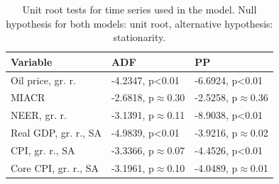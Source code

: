 \documentclass[12pt, a4paper]{extarticle}
\begin{document}
\begin{table}[h!]
	\centering
		\begin{tabular}{@{}lll@{}}
			 \toprule
			Variable & ADF & PP \\
			\midrule
			Oil price, gr. r.     & {-4.2347, p\textless{}0.01} &{-6.6924, p\textless{}0.01}   \\
			MIACR                & {-2.6818, p$\approx$0.30}          & {-2.5258, p$\approx$0.36}          \\
			NEER, gr. r.         & {-3.1391, p$\approx$0.11} & {-8.9038, p\textless{}0.01}   \\
			Real GDP, gr. r., SA  & {-4.9839, p\textless{}0.01} & {-3.9216, p$\approx$0.02} \\
			CPI, gr. r., SA          & {-3.3366, p$\approx$0.07}         & {-4.4526, p\textless{}0.01}\\
			Core CPI, gr. r., SA & {-3.1961, p$\approx$0.10} & {-4.0489, p$\approx$0.01} \\
			\bottomrule
		\end{tabular}%
	\caption{Unit root tests for time series used in the model. Null hypothesis for both models: unit root, alternative hypothesis: stationarity.}
	\label{table:unit_roots}
\end{table}
\end{document}
